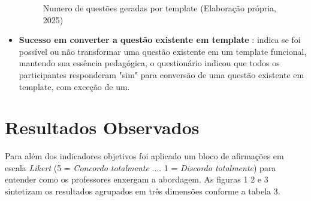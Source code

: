 \begin{itemize}
\begin{figure}[ht]
	\caption{Numero de questões geradas por template (Elaboração própria, 2025) }
	\label{fig:questoes-geradas}
\end{figure}
        \item  \textbf{Sucesso em converter a questão existente em template }: indica se foi possível ou não transformar uma questão existente em um template funcional, mantendo sua essência pedagógica, o questionário indicou que todos os participantes responderam "sim" para conversão de uma questão existente em template, com exceção de um. 
    \end{itemize}


\section{Resultados Observados}

Para além dos indicadores objetivos foi aplicado um bloco de afirmações em escala \textit{Likert} (5 = \textit{Concordo totalmente} .... 1 = \textit{Discordo totalmente})  para entender como os professores enxergam a abordagem. As figuras 1 2 e 3 sintetizam os resultados agrupados em três dimensões conforme a tabela 3.


